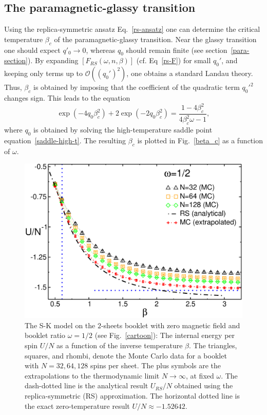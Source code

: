 \documentclass[twocolumn,superscriptaddress,prb,10pt]{revtex4-1}
\begin{document}
\subsection{The paramagnetic-glassy transition}
\label{tc-section}

Using the replica-symmetric ansatz Eq.~\eqref{rs-ansatz} one can determine 
the critical temperature $\beta_c$ of the paramagnetic-glassy transition. 
Near the glassy transition one should expect $q'_0\to0$, whereas $q_0$ 
should remain finite (see section~\ref{para-section}). By expanding $[F_{RS}(\omega,n,\beta)]$ 
(cf. Eq~\eqref{rs-F}) for small $q_0'$, and keeping only terms up to ${\mathcal O}((q_0')^2)$, 
one obtains a standard Landau theory. Thus, $\beta_c$ is obtained by imposing that the 
coefficient of the quadratic term $q_0'^2$ changes sign. This leads to the equation 
%
\begin{equation}
\exp(-4q_0\beta^2_c)+2\exp(-2q_0\beta^2_c)=\frac{1-4\beta^2_c}
{4\beta^2_c\omega-1},
\label{tc}
\end{equation}
%
where $q_0$ is obtained by solving the high-temperature saddle point equation~\eqref{saddle-high-t}. 
The resulting $\beta_c$ is plotted in Fig.~\ref{beta_c} as a function of $\omega$. 

\begin{figure}[t]
\includegraphics*[width=0.93\linewidth]{./draft_figs/U_w05}
\caption{
 The S-K model on the $2$-sheets booklet with zero magnetic field and 
 booklet ratio $\omega=1/2$ (see Fig.~\ref{cartoon}): The internal energy 
 per spin $U/N$ as a function of the inverse temperature $\beta$. The triangles, 
 squares, and rhombi, denote the Monte Carlo data for a booklet with 
 $N=32,64,128$ spins per sheet. The plus symbols are the extrapolations to the 
 thermodynamic limit $N\to\infty$, at fixed $\omega$. The dash-dotted line is the 
 analytical result $U_{RS}/N$ obtained using the replica-symmetric (RS) approximation. 
 The horizontal dotted line is the exact zero-temperature result $U/N\approx-1.52642$.
}
\label{U-MC}
\end{figure}
\end{document}
